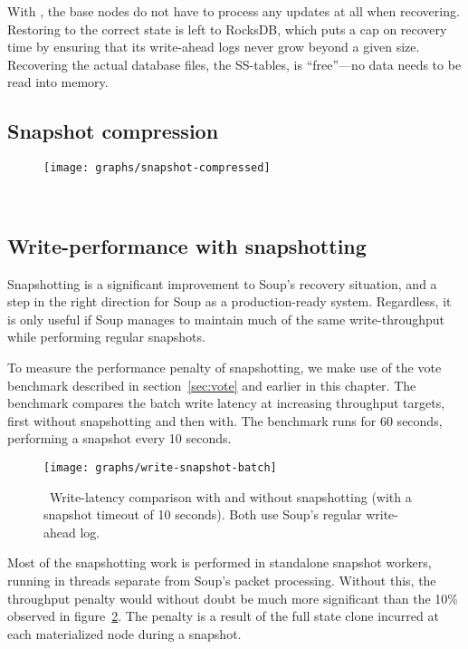 With , the base nodes do not have to process any updates
at all when recovering. Restoring  to the correct state is
left to RocksDB, which puts a cap on recovery time by ensuring that its
write-ahead logs never grow beyond a given size. Recovering the actual database
files, the SS-tables, is ``free''---no data needs to be read into memory.

\subsection{Snapshot compression}

\begin{figure}[H]
  \centering
  \texttt{[image: graphs/snapshot-compressed]}
  \caption{\
  }\label{fig:snapshot-compressed}
\end{figure}

\subsection{Write-performance with snapshotting}

Snapshotting is a significant improvement to Soup's recovery situation, and a
step in the right direction for Soup as a production-ready system. Regardless,
it is only useful if Soup manages to maintain much of the same write-throughput
while performing regular snapshots.

To measure the performance penalty of snapshotting, we make use of the vote
benchmark described in section~\ref{sec:vote} and earlier in this chapter. The
benchmark compares the batch write latency at increasing throughput targets,
first without snapshotting and then with. The benchmark runs for 60 seconds,
performing a snapshot every 10 seconds.

\begin{figure}[H]
  \centering
  \texttt{[image: graphs/write-snapshot-batch]}
  \caption{\
    Write-latency comparison with and without snapshotting (with a snapshot
    timeout of 10 seconds). Both use Soup's regular write-ahead log.
  }\label{fig:graph-snapshot}
\end{figure}

Most of the snapshotting work is performed in standalone snapshot workers,
running in threads separate from Soup's packet processing. Without this, the
throughput penalty would without doubt be much more significant than the 10\%
observed in figure~\ref{fig:graph-snapshot}. The penalty is a result of the full
state clone incurred at each materialized node during a snapshot.

